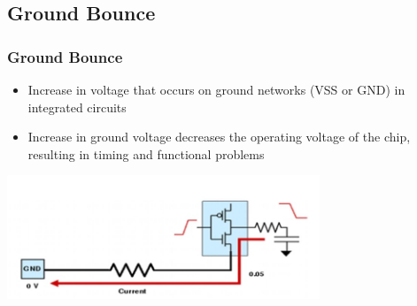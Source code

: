 \documentclass[compress]{beamer}
\begin{document}
\subsection[Ground Bounce]{Ground Bounce}
\begin{frame}
	\frametitle{Ground Bounce}
	\begin{itemize}
		\item Increase in voltage that occurs on ground networks (VSS or GND) in integrated circuits
		\item Increase in ground voltage decreases the operating voltage of the chip, resulting in timing and
		functional problems
	\end{itemize}
	\begin{center}
		\includegraphics[width=0.7\textwidth]{ground}
	\end{center}
\end{frame}
\end{document}
